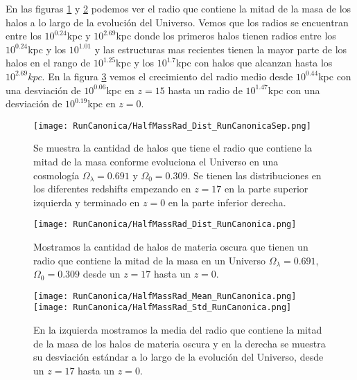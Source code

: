 En las figuras \ref{fig:Canon-HalfMassRadDistSep} y \ref{fig:Canon-HalfMassRadDist} podemos ver el radio que contiene la mitad de la masa de los halos a lo largo de la evolución del Universo. Vemos que los radios se encuentran entre los $10^{0.24}$kpc y $10^{2.69}$kpc donde los primeros halos tienen radios entre los $10^{0.24}$kpc y los $10^{1.01}$ y las estructuras mas recientes tienen la mayor parte de los halos en el rango de $10^{1.25}$kpc y los $10^{1.7}$kpc con halos que alcanzan hasta los $10^{2.69}kpc$. En la figura \ref{fig:Canon-HalfMassRadStats} vemos el crecimiento del radio medio desde $10^{0.44}$kpc con una desviación de $10^{0.06}$kpc en $z=15$ hasta un radio de $10^{1.47}$kpc con una desviación de $10^{0.19}$kpc en $z=0$.

\begin{figure}[H]
    \centering
    \texttt{[image: RunCanonica/HalfMassRad\_Dist\_RunCanonicaSep.png]}
    \caption[Radio que contiene la mitad de la masa]{\footnotesize Se muestra la cantidad de halos que tiene el radio que contiene la mitad de la masa conforme evoluciona el Universo en una cosmología $\Omega_\lambda = 0.691 $ y $\Omega_0 = 0.309$. Se tienen las distribuciones en los diferentes redshifts empezando en $z=17$ en la parte superior izquierda y terminado en $z=0$ en la parte inferior derecha.}
    \label{fig:Canon-HalfMassRadDistSep}
\end{figure}

\begin{figure}[H]
    \centering
    \texttt{[image: RunCanonica/HalfMassRad\_Dist\_RunCanonica.png]}
    \caption[Distribución del radio que contiene la mitad de la masa]{\footnotesize Mostramos la cantidad de halos de materia oscura que tienen un radio que contiene la mitad de la masa en un Universo $\Omega_\lambda = 0.691 $, $\Omega_0 = 0.309$ desde un $z=17$ hasta un $z=0$.}
    \label{fig:Canon-HalfMassRadDist}
\end{figure}

\begin{figure}[H]
    \centering
    \texttt{[image: RunCanonica/HalfMassRad\_Mean\_RunCanonica.png]}
    \texttt{[image: RunCanonica/HalfMassRad\_Std\_RunCanonica.png]}
    \caption[Media y desviación estándar del radio de la mitad de la masa]{\footnotesize En la izquierda mostramos la media del radio que contiene la mitad de la masa de los halos de materia oscura y en la derecha se muestra su desviación estándar a lo largo de la evolución del Universo, desde un $z=17$ hasta un $z=0$.}
    \label{fig:Canon-HalfMassRadStats}
\end{figure}

